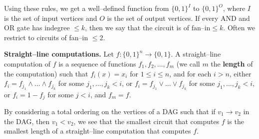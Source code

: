 \documentclass{article}
\theoremstyle{definition}
\begin{document}
Using these rules, we get a well--defined function from $\{0,1\}^{I}$ to $\{0,1\}^{O}$, where $I$ is the set of input vertices and $O$ is the set of output vertices. If every AND and OR gate has indegree $\le k$, then we say that the circuit is of $\text{fan--in} \le k$. Often we restrict to circuits of fan--in $\le 2$.
\vspace{1mm}
 
\textbf{Straight--line computations.} Let $f : \{0,1\}^n \to \{0,1\}$. A straight--line computation of $f$ is a sequence of functions $f_1,f_2,\ldots,f_m$ (we call $m$ the \textbf{length} of the computation) such that $f_i(x) = x_i$ for $1\le i\le n$, and for each $i>n$, either $f_i = f_{j_1} \wedge \ldots \wedge f_{j_k}$ for some $j_1,\ldots,j_k < i$, or $f_i = f_{j_1} \vee \ldots \vee f_{j_k}$ for some $j_1,\ldots,j_k < i$, or $f_i = 1 - f_j$ for some $j<i$, and $f_m = f$.
\vspace{1mm}
 
By considering a total ordering on the vertices of a DAG such that if $v_1 \to v_2$ in the DAG, then $v_1 < v_2$, we see that the smallest circuit that computes $f$ is the smallest length of a straight--line computation that computes $f$.
\end{document}
